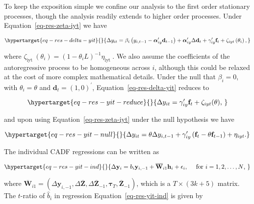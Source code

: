 \documentclass[
  12pt]{article}
\begin{document}
To keep the exposition simple we confine our analysis to the first order
stationary processes, though the analysis readily extends to higher
order processes. Under Equation~\ref{eq-res-zeta-iyt} we have

\begin{equation}\protect\hypertarget{eq-res-delta-yit}{}{
\Delta y_{i t}=\beta_i\left(y_{i, t-1}-\boldsymbol{\alpha}_{i y}^{\prime} \mathbf{d}_{t-1}\right)+\boldsymbol{\alpha}_{i y}^{\prime} \Delta \mathbf{d}_t+\gamma_{i y}^{\prime} \mathbf{f}_t+\zeta_{i y t}\left(\theta_i\right),
}\label{eq-res-delta-yit}\end{equation}

where
\(\zeta_{\text {iyt }}\left(\theta_i\right)=\left(1-\theta_i L\right)^{-1} \eta_{\text {iyt }}\).
We also assume the coefficients of the autoregressive process to be
homogeneous across \(i\), although this could be relaxed at the cost of
more complex mathematical details. Under the null that \(\beta_i=0\),
with \(\theta_i=\theta\) and \(\mathbf{d}_t=(1,0)^{\prime}\),
Equation~\ref{eq-res-delta-yit} reduces to

\begin{equation}\protect\hypertarget{eq-res-yit-reduce}{}{
\Delta y_{i t}=\gamma_{i y}^{\prime} \mathbf{f}_t+\zeta_{i y t}(\theta) \text {, }
}\label{eq-res-yit-reduce}\end{equation}

and upon using Equation~\ref{eq-res-zeta-iyt} under the null hypothesis
we have

\begin{equation}\protect\hypertarget{eq-res-yit-null}{}{
\Delta y_{i t}=\theta \Delta y_{i, t-1}+\gamma_{i y}^{\prime}\left(\mathbf{f}_t-\theta \mathbf{f}_{t-1}\right)+\eta_{i y t} .
}\label{eq-res-yit-null}\end{equation}

The individual CADF regressions can be written as

\begin{equation}\protect\hypertarget{eq-res-yit-ind}{}{
\Delta \mathbf{y}_i=b_i \mathbf{y}_{i,-1}+\overline{\mathbf{W}}_{i 1} \mathbf{h}_i+\epsilon_i, \quad \text { for } i=1,2, \ldots, N \text {, }
}\label{eq-res-yit-ind}\end{equation}

where
\(\overline{\mathbf{W}}_{i 1}=\left(\Delta \mathbf{y}_{i,-1}, \Delta \overline{\mathbf{Z}}, \Delta \overline{\mathbf{Z}}_{-1}, \boldsymbol{\tau}_T, \overline{\mathbf{Z}}_{-1}\right)\),
which is a \(T \times(3 k+5)\) matrix. The \(t\)-ratio of \(\hat{b}_i\)
in regression Equation~\ref{eq-res-yit-ind} is given by
\end{document}
